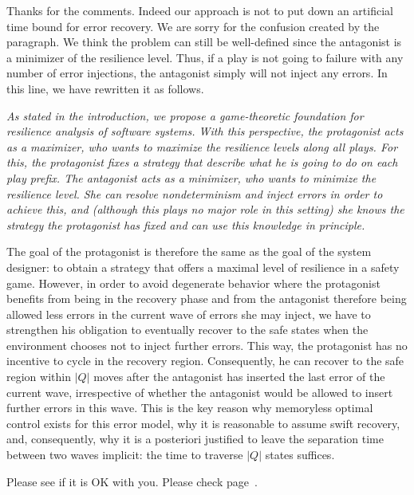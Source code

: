 \documentclass[times,10pt,twocolumn]{article}
\newcounter{sequent1}
\newcounter{sequent2}
\newcounter{sequent3}
\newcounter{sequent4}
\newcounter{cabbage0}
\newcounter{cabbage1}
\newcounter{cabbage2}
\newcounter{cabbage3}
\newcounter{bean0}
\newcounter{bean1}
\newcounter{bean2}
\newcounter{bean3}
\newcounter{bean4}
\newcounter{bean5}
\newcounter{bean6}
\newenvironment{reply1}{\begin{list}{\bf (Reply 1.\arabic{bean1}):} 
        {\usecounter{bean1}\setcounter{bean1}{\value{cabbage1}} \item \setcounter{cabbage1}{\value{bean1}} 
        }
}{\end{list}}
\begin{document}
\begin{reply1} \label{reply1m.memoryless.bounded}
Thanks for the comments. 
Indeed our approach is not to put down an artificial time bound
for error recovery.  
We are sorry for the confusion created by the paragraph.
We think the problem can still be well-defined since 
the antagonist is a minimizer of the resilience level. 
Thus, if a play is not going to failure with any number of 
error injections, the antagonist simply will not 
inject any errors.  
In this line, we have rewritten it as follows. 
\begin{center}
\parbox{140mm}{\em 
As stated in the introduction, we propose 
a game-theoretic foundation for resilience analysis of software systems. 
With this perspective, the protagonist acts as a maximizer, who wants to maximize the 
resilience levels along all plays.
For this, the protagonist fixes a strategy that describe what he is going to do on each play prefix.
The antagonist acts as a minimizer, who wants to minimize the resilience level.
She can resolve nondeterminism and inject errors in order to achieve this, and (although this plays no major role in this setting) she knows the strategy the protagonist has fixed and can use this knowledge in principle.

The goal of the protagonist is therefore the same as the goal of the system designer: to obtain a strategy that offers a maximal level of resilience in a safety game.  
However, in order to avoid degenerate behavior where the protagonist benefits from being in the recovery phase and from the antagonist therefore being allowed less errors in the current wave of errors she may inject, we have to strengthen his obligation to eventually recover to the safe states when the environment chooses not to inject further errors.
This way, the protagonist has no incentive to cycle in the recovery region.
Consequently, he can recover to the safe region within $|Q|$ moves after the antagonist has inserted the last error of the current wave, irrespective of whether the antagonist would be allowed to insert further errors in this wave.
This is the key reason why memoryless optimal control exists for this error model, why it is reasonable to assume swift recovery, and, consequently, why it is a posteriori justified to leave the separation time between two waves implicit: the time to traverse $|Q|$ states suffices.
}
\end{center} 
Please see if it is OK with you. 
Please check page~\pageref{reply1.memoryless.unbounded.resilience}. 
\end{reply1} 
\end{document}
